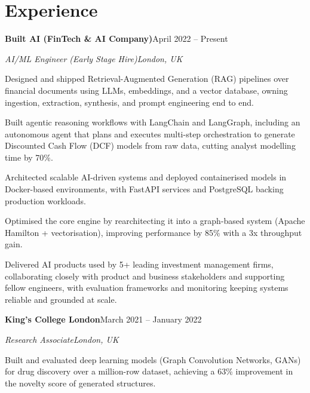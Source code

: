 \documentclass[10pt,a4paper]{article}
\newcommand{\entry}[4]{%
  {\color{company}\bfseries #1}\hfill {\color{muted}#2}\par
  \vspace{1pt}
  {\itshape #3}\hfill {\color{muted}\itshape #4}\par
  \vspace{3pt}%
}
\begin{document}
\section{Experience}
\entry{Built AI (FinTech \& AI Company)}{April 2022 -- Present}{AI/ML Engineer (Early Stage Hire)}{London, UK}
\begin{tight}
  \item Designed and shipped Retrieval-Augmented Generation (RAG) pipelines over financial documents using LLMs, embeddings, and a vector database, owning ingestion, extraction, synthesis, and prompt engineering end to end.
  \item Built agentic reasoning workflows with LangChain and LangGraph, including an autonomous agent that plans and executes multi-step orchestration to generate Discounted Cash Flow (DCF) models from raw data, cutting analyst modelling time by 70\%.
  \item Architected scalable AI-driven systems and deployed containerised models in Docker-based environments, with FastAPI services and PostgreSQL backing production workloads.
  \item Optimised the core engine by rearchitecting it into a graph-based system (Apache Hamilton + vectorisation), improving performance by 85\% with a 3x throughput gain.
  \item Delivered AI products used by 5+ leading investment management firms, collaborating closely with product and business stakeholders and supporting fellow engineers, with evaluation frameworks and monitoring keeping systems reliable and grounded at scale.
\end{tight}

\entry{King's College London}{March 2021 -- January 2022}{Research Associate}{London, UK}
\begin{tight}
  \item Built and evaluated deep learning models (Graph Convolution Networks, GANs) for drug discovery over a million-row dataset, achieving a 63\% improvement in the novelty score of generated structures.
\end{tight}

\end{document}
